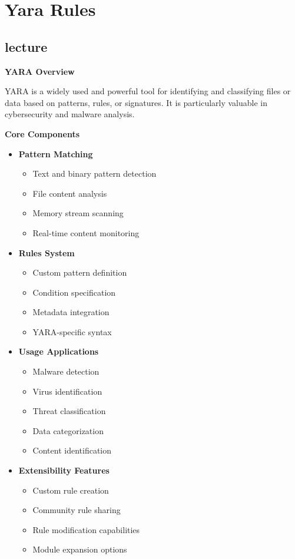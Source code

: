 \chapter{Yara Rules}
\newpage

\section{lecture}
\textbf{YARA Overview}

YARA is a widely used and powerful tool for identifying and classifying files or data based on patterns, rules, or signatures. It is particularly valuable in cybersecurity and malware analysis.

\textbf{Core Components}
\begin{itemize}
    \item \textbf{Pattern Matching}
        \begin{itemize}
            \item Text and binary pattern detection
            \item File content analysis
            \item Memory stream scanning
            \item Real-time content monitoring
        \end{itemize}

    \item \textbf{Rules System}
        \begin{itemize}
            \item Custom pattern definition
            \item Condition specification
            \item Metadata integration
            \item YARA-specific syntax
        \end{itemize}

    \item \textbf{Usage Applications}
        \begin{itemize}
            \item Malware detection
            \item Virus identification
            \item Threat classification
            \item Data categorization
            \item Content identification
        \end{itemize}

    \item \textbf{Extensibility Features}
        \begin{itemize}
            \item Custom rule creation
            \item Community rule sharing
            \item Rule modification capabilities
            \item Module expansion options
        \end{itemize}


\end{itemize}
